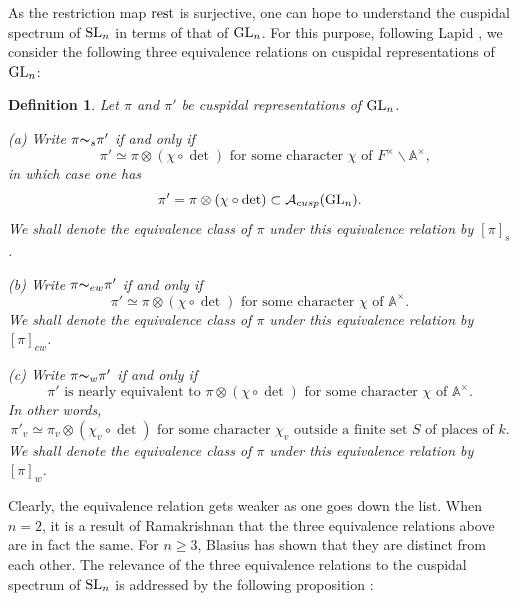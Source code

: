 \documentclass[11pt]{amsart}
\theoremstyle{plain}
\newtheorem{definition}[equation]{Definition}
\numberwithin{equation}{section}
\newcommand{\A}{\mathbb A}
\def\SL{{\rm SL}}
\def\GL{{\rm GL}}
\def\A{{\mathbb A}}
\begin{document}
As the restriction map ${\rm rest}$ is surjective, one can hope to understand the cuspidal spectrum of $\SL_n$ in terms of that of $\GL_n$. For this purpose, following Lapid \cite{L1}, we consider the following three equivalence relations on cuspidal representations of $\GL_n$: 
\begin{definition}
Let $\pi$ and $\pi'$ be cuspidal representations of $\GL_n$.
\vskip 5pt

\noindent (a)  Write  $\pi {\thicksim}_s \pi' $ if and only if
\[
  \text{ $\pi' \simeq  \pi \otimes (\chi \circ \det)$ for some character $\chi$ of $F^{\times} \backslash \A^{\times}$,} \]
in which case one has
\[  \pi' =   \pi \otimes (\chi \circ \det) \subset \mathcal{A}_{cusp}(\GL_n). \]
We shall denote the equivalence class of $\pi$ under this equivalence relation by $[\pi]_s$.
\vskip 5pt

\noindent (b)  Write  $\pi {\thicksim}_{ew} \pi'$ if and only if
 \[  \text{$\pi' \simeq \pi \otimes (\chi \circ \det)$  for some character $\chi$ of $\A^{\times}$.} \]
 We shall denote the equivalence class of $\pi$ under this equivalence relation by $[\pi]_{ew}$.
\vskip 5pt

\noindent (c)  Write   $\pi {\thicksim}_{w} \pi'$ if and only if 
  \[  \text{$\pi'$ is nearly equivalent to $\pi \otimes (\chi \circ \det)$  for some character $\chi$ of $\A^{\times}$.} \]
  In other words, 
\[ \text{$\pi'_v \simeq \pi_v \otimes (\chi_v \circ \det)$  for some character $\chi_v$ outside a finite set $S$ of places of $k$.} \]
We shall denote the equivalence class of $\pi$ under this equivalence relation by $[\pi]_w$.
 \end{definition}
Clearly, the equivalence relation gets weaker as one goes down the list. When $n=2$, it is a result of Ramakrishnan \cite{Ra1} that the three equivalence relations above are in fact the same. 
For $n \geq 3$, Blasius \cite{B} has shown that they are distinct from each other.  The relevance of the three equivalence relations to the cuspidal spectrum of $\SL_n$ is addressed  by the following proposition \cite{L1, HiS1, HiS2}:
\vskip 5pt
\end{document}
